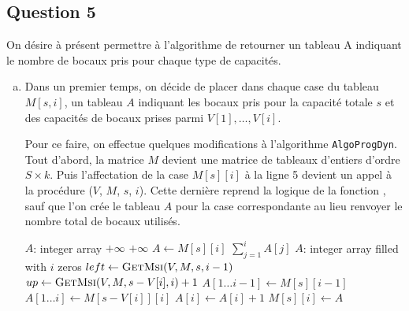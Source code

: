 \documentclass[12pt,a4paper]{article}
\begin{document}
\subsection*{Question 5}
On d\'esire \`a pr\'esent permettre \`a l'algorithme de retourner un tableau A indiquant le nombre de bocaux pris pour chaque type de capacit\'es.

\begin{enumerate}[a)]
 \item Dans un premier temps, on d\'ecide de placer dans chaque case du tableau $M[s,i]$, un tableau $A$ indiquant les bocaux pris pour la capacit\'e totale $s$ et des capacit\'es de bocaux prises parmi $V[1],\dotsc,V[i]$. 
 
 Pour ce faire, on effectue quelques modifications \`a l'algorithme \texttt{AlgoProgDyn}. Tout d'abord, la matrice $M$ devient une matrice de tableaux d'entiers d'ordre $S \times k$.  Puis l'affectation de la case $M[s][i]$ \`a la ligne 5 devient un appel \`a la proc\'edure ($V$, $M$, $s$, $i$). Cette derni\`ere reprend la logique de la fonction , sauf que l'on cr\'ee le tableau $A$ pour la case correspondante au lieu renvoyer le nombre total de bocaux utilis\'es. 
 
 \begin{algorithm}
\begin{algorithmic}[1]
    \State $A$: integer array
        \State {}
        \State \Return $+\infty$
        \State \Return $+\infty$
    \Else
        \State $A \gets M[s][i]$
        \State \Return $\sum_{j=1}^{i} A[j]$
    \EndIf
\EndFunction
\Statex
{}
    \State $A$: integer array filled with $i$ zeros
        \State $left \gets \Call{GetMsi}{V, M, s, i-1}$
        \State $up \gets \Call{GetMsi}{V, M, s-V[i], i}+1$
            \State $A[1\dotsc i-1] \gets M[s][i-1]$
        \Else
            \State $A[1\dotsc i] \gets M[s-V[i]][i]$
            \State $A[i] \gets A[i] + 1$
        \EndIf
    \EndIf
    \State $M[s][i] \gets A$
\EndFunction
\end{algorithmic}
\end{algorithm}
 

\end{enumerate}
\end{document}
